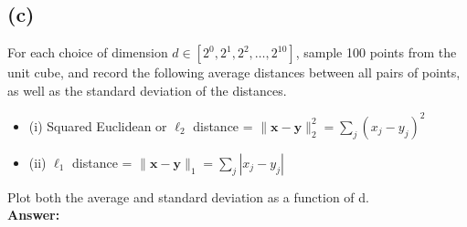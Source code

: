 \documentclass{article}
\begin{document}
\subsection*{(c)}
For each choice of dimension $d \in [2^0, 2^1, 2^2, \dots, 2^{10}]$, sample 100 points from the unit cube, and record the following average distances between all pairs of points, as well as the standard deviation of the distances.
\begin{itemize}
    \item (i) Squared Euclidean or $\ell_2$ distance = $\| \mathbf{x} - \mathbf{y} \|_2^2 = \sum_j (x_j - y_j)^2$
    \item (ii) $\ell_1$ distance = $\| \mathbf{x} - \mathbf{y} \|_1 = \sum_j |x_j - y_j|$
\end{itemize}
Plot both the average and standard deviation as a function of d. \\
\color{answer}
\textbf{Answer:}
\end{document}

